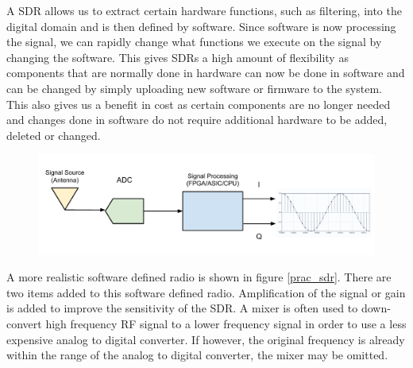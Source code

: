 A SDR allows us to extract certain hardware functions, such as filtering, into the digital domain and is then defined by software.  Since software is now processing the signal, we can rapidly change what functions we execute on the signal by changing the software.  This gives SDRs a high amount of flexibility as components that are normally done in hardware can now be done in software and can be changed by simply uploading new software or firmware to the system.  This also gives us a benefit in cost as certain components are no longer needed and changes done in software do not require additional hardware to be added, deleted or changed.

{\begin{figure}[h!tb] 
\centering
\includegraphics[width=\textwidth]{Images/SDR_Ideal_block.pdf}
\label{ideal_sdr}
\end{figure}
}

A more realistic software defined radio is shown in figure \ref{prac_sdr}.  There are two items added to this software defined radio.  Amplification of the signal or gain is added to improve the sensitivity of the SDR.  A mixer is often used to down-convert high frequency RF signal to a lower frequency signal in order to use a less expensive analog to digital converter.  If however, the original frequency is already within the range of the analog to digital converter, the mixer may be omitted.  


